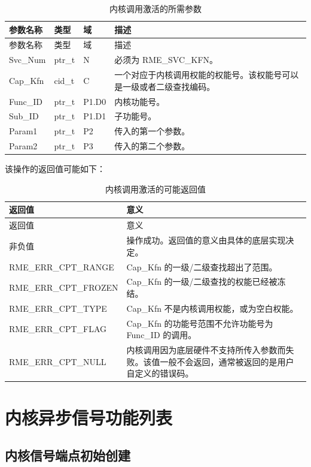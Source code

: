\begin{xltabular}{\textwidth}{@{}>{\hsize\raggedright\arraybackslash}X>{\hsize\raggedright\arraybackslash}X>{\hsize\raggedright\arraybackslash}X>{\hsize\raggedright\arraybackslash}X@{}}
\caption{内核调用激活的所需参数}\label{tab:6-3-kernel-call-activation-parameters}\\
\toprule
参数名称 & 类型 & 域 & 描述\tabularnewline
\endfirsthead
\toprule
参数名称 & 类型 & 域 & 描述\tabularnewline
\midrule
\endhead
\bottomrule
\endlastfoot
Svc\_Num & ptr\_t & N & 必须为 RME\_SVC\_KFN。\tabularnewline
Cap\_Kfn & cid\_t & C &
一个对应于内核调用权能的权能号。该权能号可以是一级或者二级查找编码。\tabularnewline
Func\_ID & ptr\_t & P1.D0 & 内核功能号。\tabularnewline
Sub\_ID & ptr\_t & P1.D1 & 子功能号。\tabularnewline
Param1 & ptr\_t & P2 & 传入的第一个参数。\tabularnewline
Param2 & ptr\_t & P3 & 传入的第二个参数。\tabularnewline
\end{xltabular}

该操作的返回值可能如下：

\begin{xltabular}{\textwidth}{@{}>{\hsize\raggedright\arraybackslash}X>{\hsize\raggedright\arraybackslash}X@{}}
\caption{内核调用激活的可能返回值}\label{tab:6-4-kernel-call-activation-return-values}\\
\toprule
返回值 & 意义\tabularnewline
\endfirsthead
\toprule
返回值 & 意义\tabularnewline
\midrule
\endhead
\bottomrule
\endlastfoot
    非负值 & 操作成功。返回值的意义由具体的底层实现决定。\tabularnewline
    RME\_ERR\_CPT\_RANGE & Cap\_Kfn 的一级/二级查找超出了范围。\tabularnewline
    RME\_ERR\_CPT\_FROZEN & Cap\_Kfn 的一级/二级查找的权能已经被冻结。\tabularnewline
    RME\_ERR\_CPT\_TYPE & Cap\_Kfn 不是内核调用权能，或为空白权能。\tabularnewline
    RME\_ERR\_CPT\_FLAG & Cap\_Kfn 的功能号范围不允许功能号为 Func\_ID 的调用。\tabularnewline
    RME\_ERR\_CPT\_NULL & 内核调用因为底层硬件不支持所传入参数而失败。该值一般不会返回，通常被返回的是用户自定义的错误码。\tabularnewline
\end{xltabular}

\section{内核异步信号功能列表}\label{sec:6-async-signal-function-list}

\subsection{内核信号端点初始创建}\label{subsec:6-kernel-signal-endpoint-initial-creation}

